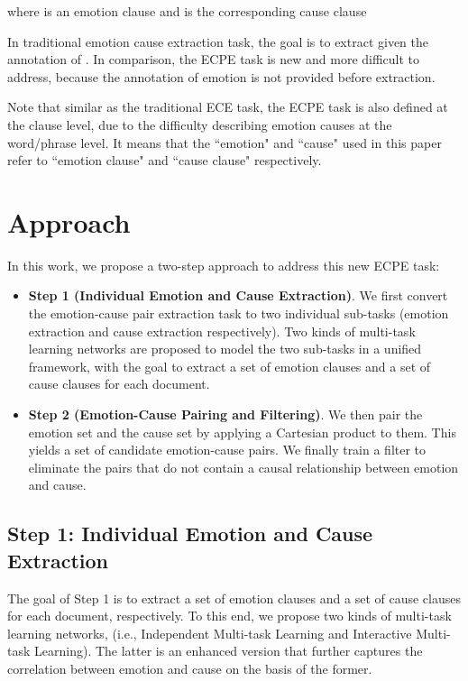 \documentclass[11pt,a4paper]{article}
\begin{document}
where  is an emotion clause and  is the corresponding cause clause

In traditional emotion cause extraction task, the goal is to extract  given the annotation of . In comparison, the ECPE task is new and more difficult to address, because the annotation of emotion  is not provided before extraction.

Note that similar as the traditional ECE task, the ECPE task is also defined at the clause level, due to the difficulty describing emotion causes at the word/phrase level. It means that the ``emotion" and ``cause" used in this paper refer to ``emotion clause" and ``cause clause" respectively.


\section{Approach}
In this work, we propose a two-step approach to address this new ECPE task:


\begin{itemize}
	\item \textbf{Step 1 (Individual Emotion and Cause Extraction)}. We first convert the emotion-cause pair extraction task to two individual sub-tasks (emotion extraction and cause extraction respectively). Two kinds of multi-task learning networks are proposed to model the two sub-tasks in a unified framework, with the goal to extract a set of emotion clauses  and a set of cause clauses  for each document.
	\item \textbf{Step 2 (Emotion-Cause Pairing and Filtering)}. We then pair the emotion set  and the cause set  by applying a Cartesian product to them. This yields a set of candidate emotion-cause pairs. We finally train a filter to eliminate the pairs that do not contain a causal relationship between emotion and cause.
	
\end{itemize}



\subsection{Step 1: Individual Emotion and Cause Extraction}
The goal of Step 1 is to extract a set of emotion clauses and a set of cause clauses for each document, respectively. To this end, we propose two kinds of multi-task learning networks, (i.e., Independent Multi-task Learning and Interactive Multi-task Learning). The latter is an enhanced version that further captures the correlation between emotion and cause on the basis of the former.
\end{document}

